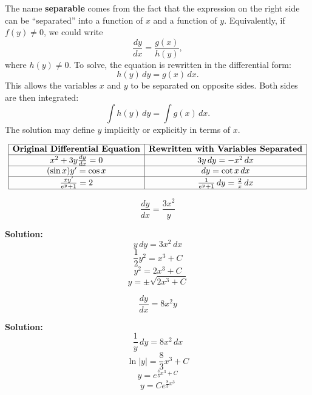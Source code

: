 \documentclass[12pt]{article}
\theoremstyle{beautifulthm}
\begin{document}
The name \textbf{separable} comes from the fact that the expression on the right side can be ``separated'' into a function of $x$ and a function of $y$. Equivalently, if $f(y) \neq 0$, we could write
\[
\frac{dy}{dx} = \frac{g(x)}{h(y)},
\]
where \(h(y) \neq 0\). To solve, the equation is rewritten in the differential form:
\[
h(y) \, dy = g(x) \, dx.
\]
This allows the variables \(x\) and \(y\) to be separated on opposite sides. Both sides are then integrated:
\[
\int h(y) \, dy = \int g(x) \, dx.
\]
The solution may define \(y\) implicitly or explicitly in terms of \(x\).

\begin{tcolorbox}[colback=examplebg, colframe=red!75!black, title=\textbf{EXAMPLE 1: }, fonttitle=\bfseries, sharp corners]

\[
\begin{array}{|c|c|}
\hline
\textbf{Original Differential Equation} & \textbf{Rewritten with Variables Separated} \\
\hline
x^2 + 3y \frac{dy}{dx} = 0 & 3y \, dy = -x^2 \, dx \\
\hline
(\sin x)y' = \cos x & dy = \cot x \, dx \\
\hline
\frac{x y'}{e^y + 1} = 2 & \frac{1}{e^y + 1} \, dy = \frac{2}{x} \, dx \\
\hline
\end{array}
\]


\end{tcolorbox}


\newpage
\begin{tcolorbox}[colback=examplebg, colframe=red!75!black, title=\textbf{EXAMPLE 2: Solved Differential Equations}, fonttitle=\bfseries, sharp corners]

\[
\frac{dy}{dx} = \frac{3x^2}{y}
\]

\tcblower
\textbf{Solution:} 
\[
y \, dy = 3x^2 \, dx
\]
\[
\frac{1}{2}y^2 = x^3 + C
\]
\[
y^2 = 2x^3 + C
\]
\[
y = \pm \sqrt{2x^3 + C}
\]
\end{tcolorbox}


\begin{tcolorbox}[colback=examplebg, colframe=red!75!black, title=\textbf{EXAMPLE 3: Solved Differential Equations}, fonttitle=\bfseries, sharp corners]
\[
\frac{dy}{dx} = 8x^2y
\]



\tcblower
\textbf{Solution:} 
\[
\frac{1}{y} \, dy = 8x^2 \, dx
\]
\[
\ln|y| = \frac{8}{3}x^3 + C
\]
\[
y = e^{\frac{8}{3}x^3 + C}
\]
\[
y = Ce^{\frac{8}{3}x^3}
\]
\end{tcolorbox}
\end{document}
